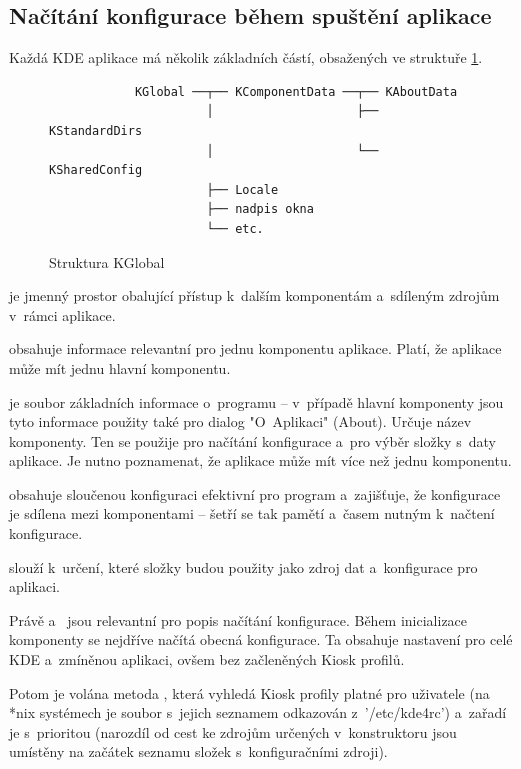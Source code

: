 \subsection*{Načítání konfigurace během spuštění aplikace}
Každá KDE aplikace má několik základních částí, obsažených ve struktuře  \ref{fig:kglobal}.

\begin{figure}[h]
    \centering
    \begin{verbatim}
            KGlobal ──┬── KComponentData ──┬── KAboutData
                      │                    ├── KStandardDirs
                      │                    └── KSharedConfig
                      ├── Locale
                      ├── nadpis okna
                      └── etc.\end{verbatim}
    \caption{Struktura KGlobal}
    \label{fig:kglobal}
\end{figure}

 je jmenný prostor obalující přístup k~dalším komponentám a~sdíleným zdrojům v~rámci aplikace.

 obsahuje informace relevantní pro jednu komponentu aplikace. Platí, že aplikace může mít jednu hlavní komponentu.

 je soubor základních informace o~programu -- v~případě hlavní komponenty jsou tyto informace použity také pro dialog "O~Aplikaci" (About). Určuje název komponenty. Ten se použije pro načítání konfigurace a~pro výběr složky s~daty aplikace. Je nutno poznamenat, že aplikace může mít více než jednu komponentu.

 obsahuje sloučenou konfiguraci efektivní pro program a~zajišťuje, že konfigurace je sdílena mezi komponentami -- šetří se tak pamětí a~časem nutným k~načtení konfigurace.

 slouží k~určení, které složky budou použity jako zdroj dat a~konfigurace pro aplikaci.

Právě  a~ jsou relevantní pro popis načítání konfigurace. Během inicializace komponenty se nejdříve načítá obecná konfigurace. Ta obsahuje nastavení pro celé KDE a~zmíněnou aplikaci, ovšem bez začleněných Kiosk profilů.

Potom je volána metoda , která vyhledá Kiosk profily platné pro uživatele (na *nix systémech je soubor s~jejich seznamem odkazován z~'/etc/kde4rc') a~zařadí je s~prioritou (narozdíl od cest ke zdrojům určených v~konstruktoru  jsou umístěny na začátek seznamu složek s~konfiguračními zdroji).

